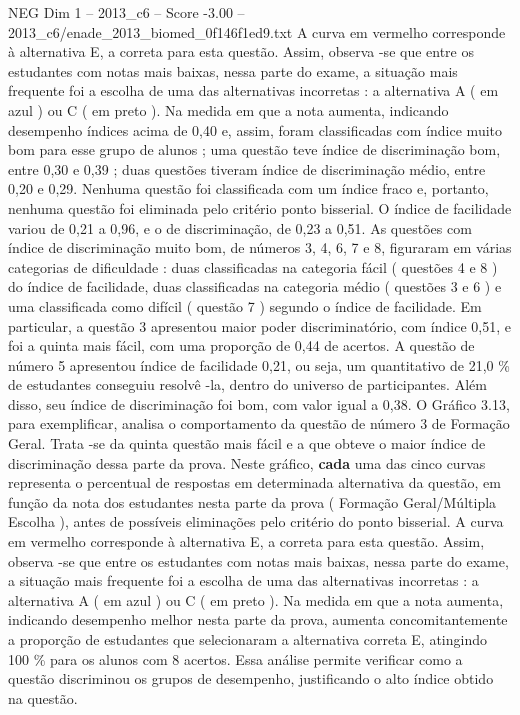 \begin{textsample}{NEG Dim 1 – 2013\_c6 – Score -3.00 – 2013\_c6/enade\_2013\_biomed\_0f146f1ed9.txt}
A curva em vermelho corresponde à alternativa E, a correta para esta questão.
Assim, observa -se que entre os estudantes com notas mais baixas, nessa parte do exame, a situação mais frequente foi a escolha de uma das alternativas incorretas : a alternativa A ( em azul ) ou C ( em preto ).
Na medida em que a nota aumenta, indicando desempenho índices acima de 0,40 e, assim, foram classificadas com índice muito bom para esse grupo de alunos ; uma questão teve índice de discriminação bom, entre 0,30 e 0,39 ; duas questões tiveram índice de discriminação médio, entre 0,20 e 0,29.
Nenhuma questão foi classificada com um índice fraco e, portanto, nenhuma questão foi eliminada pelo critério ponto bisserial.
O índice de facilidade variou de 0,21 a 0,96, e o de discriminação, de 0,23 a 0,51.
As questões com índice de discriminação muito bom, de números 3, 4, 6, 7 e 8, figuraram em várias categorias de dificuldade : duas classificadas na categoria fácil ( questões 4 e 8 ) do índice de facilidade, duas classificadas na categoria médio ( questões 3 e 6 ) e uma classificada como difícil ( questão 7 ) segundo o índice de facilidade.
Em particular, a questão 3 apresentou maior poder discriminatório, com índice 0,51, e foi a quinta mais fácil, com uma proporção de 0,44 de acertos.
A questão de número 5 apresentou índice de facilidade 0,21, ou seja, um quantitativo de 21,0 \% de estudantes conseguiu resolvê -la, dentro do universo de participantes.
Além disso, seu índice de discriminação foi bom, com valor igual a 0,38.
O Gráfico 3.13, para exemplificar, analisa o comportamento da questão de número 3 de Formação Geral.
Trata -se da quinta questão mais fácil e a que obteve o maior índice de discriminação dessa parte da prova.
Neste gráfico, \textbf{cada} uma das cinco curvas representa o percentual de respostas em determinada alternativa da questão, em função da nota dos estudantes nesta parte da prova ( Formação Geral/Múltipla Escolha ), antes de possíveis eliminações pelo critério do ponto bisserial.
A curva em vermelho corresponde à alternativa E, a correta para esta questão.
Assim, observa -se que entre os estudantes com notas mais baixas, nessa parte do exame, a situação mais frequente foi a escolha de uma das alternativas incorretas : a alternativa A ( em azul ) ou C ( em preto ).
Na medida em que a nota aumenta, indicando desempenho melhor nesta parte da prova, aumenta concomitantemente a proporção de estudantes que selecionaram a alternativa correta E, atingindo 100 \% para os alunos com 8 acertos.
Essa análise permite verificar como a questão discriminou os grupos de desempenho, justificando o alto índice obtido na questão.

\end{textsample}
